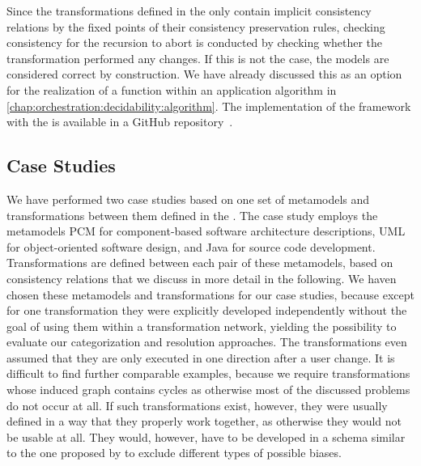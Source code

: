 Since the transformations defined in the \reactionslanguage only contain implicit consistency relations by the fixed points of their consistency preservation rules, checking consistency for the recursion to abort is conducted by checking whether the transformation performed any changes.
If this is not the case, the models are considered correct by construction.
We have already discussed this as an option for the realization of a  function within an application algorithm in \autoref{chap:orchestration:decidability:algorithm}.
The implementation of the framework with the \reactionslanguage is available in a GitHub repository~\cite{vitruvFrameworkGithub}.






\subsection{Case Studies}

We have performed two case studies based on one set of metamodels and transformations between them defined in the \reactionslanguage.
The case study employs the metamodels \gls{PCM} for component-based software architecture descriptions, \gls{UML} for object-oriented software design, and Java for source code development.
Transformations are defined between each pair of these metamodels, based on consistency relations that we discuss in more detail in the following.
We haven chosen these metamodels and transformations for our case studies, because except for one transformation they were explicitly developed independently without the goal of using them within a transformation network, yielding the possibility to evaluate our categorization and resolution approaches.
The transformations even assumed that they are only executed in one direction after a user change.
It is difficult to find further comparable examples, because we require transformations whose induced graph contains cycles as otherwise most of the discussed problems do not occur at all.
If such transformations exist, however, they were usually defined in a way that they properly work together, as otherwise they would not be usable at all.
They would, however, have to be developed in a schema similar to the one proposed by \textcite{kramer2016c} to exclude different types of possible biases.

